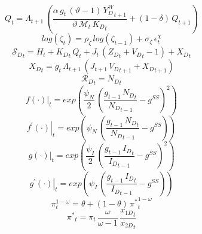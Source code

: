 \documentclass[10pt,a4paper]{article}
\begin{document}
\begin{dmath}
{Q}_{t}={\Lambda}_{t+1}\, \left(\frac{\alpha\, {g}_{t}\, \left(\vartheta-1\right)\, {Y^W_D}_{t+1}}{\vartheta\, {\mathcal{M}}_{t}\, {K_D}_{t}}+\left(1-\delta\right)\, {Q}_{t+1}\right)
\end{dmath}
\begin{dmath}
log\left({\zeta}_{t}\right)={{\rho}_{\zeta}}\, log\left({\zeta}_{t-1}\right)+{{\sigma}_{\zeta}}\, {\epsilon}^{\chi}_{t}
\end{dmath}
\begin{dmath}
{\mathcal{S}_{D}}_{t}={H}_{t}+{K_D}_{t}\, {Q}_{t}+{J}_{t}\, \left({Z_D}_{t}+{V_D}_{t}-1\right)+{X_D}_{t}
\end{dmath}
\begin{dmath}
{X_D}_{t}={g}_{t}\, {\Lambda}_{t+1}\, \left({J}_{t+1}\, {V_D}_{t+1}+{X_D}_{t+1}\right)
\end{dmath}
\begin{dmath}
{\mathcal{R}_{D}}_{t}={N_D}_{t}
\end{dmath}
\begin{dmath}
{\left.       f\left( \cdot \right)            \right|}_{t}=exp\left(\frac{{\psi_N}}{2}\, \left(\frac{{g}_{t-1}\, {N_D}_{t}}{{N_D}_{t-1}}-{g^{SS}}\right)^{2}\right)
\end{dmath}
\begin{dmath}
{\left.       f^{\prime}\left( \cdot \right)   \right|}_{t}=exp\left({\psi_N}\, \left(\frac{{g}_{t-1}\, {N_D}_{t}}{{N_D}_{t-1}}-{g^{SS}}\right)\right)
\end{dmath}
\begin{dmath}
{\left.       g\left( \cdot \right)            \right|}_{t}=exp\left(\frac{{\psi_I}}{2}\, \left(\frac{{g}_{t-1}\, {I_D}_{t}}{{I_D}_{t-1}}-{g^{SS}}\right)^{2}\right)
\end{dmath}
\begin{dmath}
{\left.       g^{\prime}\left( \cdot \right)   \right|}_{t}=exp\left({\psi_I}\, \left(\frac{{g}_{t-1}\, {I_D}_{t}}{{I_D}_{t-1}}-{g^{SS}}\right)\right)
\end{dmath}
\begin{dmath}
{\pi}_{t}^{1-{\omega}}={\theta}+\left(1-{\theta}\right)\, {\pi^*}_{t}^{1-{\omega}}
\end{dmath}
\begin{dmath}
{\pi^*}_{t}={\pi}_{t}\, \frac{{\omega}}{{\omega}-1}\, \frac{{x_{1D}}_{t}}{{x_{2D}}_{t}}
\end{dmath}
\end{document}
